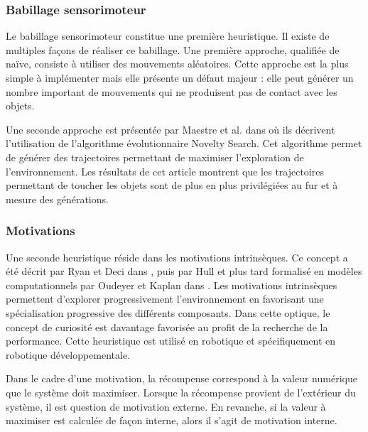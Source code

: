 \documentclass[draft]{llncs}
\begin{document}
\subsubsection{Babillage sensorimoteur}

Le babillage sensorimoteur constitue une première heuristique.
Il existe de multiples façons de réaliser ce babillage.
Une première approche, qualifiée de naïve, consiste à utiliser des mouvements aléatoires.
Cette approche est la plus simple à implémenter mais elle présente un défaut majeur : elle peut générer un nombre important de mouvements qui ne produisent pas de contact avec les objets.

Une seconde approche est présentée par Maestre et al. dans \cite{Maestre2015} où ils décrivent l'utilisation de l'algorithme évolutionnaire Novelty Search.
Cet algorithme permet de générer des trajectoires permettant de maximiser l'exploration de l'environnement.
Les résultats de cet article montrent que les trajectoires permettant de toucher les objets sont de plus en plus privilégiées au fur et à mesure des générations.




\subsubsection{Motivations}

Une seconde heuristique réside dans les motivations intrinsèques.
Ce concept a été décrit par Ryan et Deci dans \cite{Ryan2000}, puis par Hull et plus tard formalisé en modèles computationnels par Oudeyer et Kaplan dans \cite{10.3389/neuro.12.006.2007}.
Les motivations intrinsèques permettent d'explorer progressivement l'environnement en favorisant une spécialisation progressive des différents composants.
Dans cette optique, le concept de curiosité est davantage favorisée au profit de la recherche de la performance.
Cette heuristique est utilisé en robotique et spécifiquement en robotique développementale.



Dans le cadre d'une motivation, la récompense correspond à la valeur numérique que le système doit maximiser.
Lorsque la récompense provient de l'extérieur du système, il est question de motivation externe.
En revanche, si la valeur à maximiser est calculée de façon interne, alors il s'agit de motivation interne.

\end{document}
